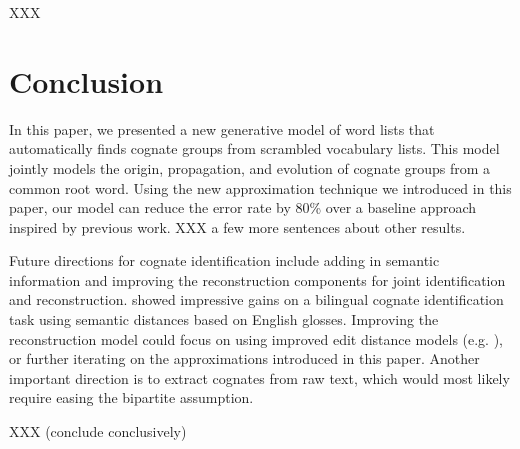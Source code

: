 \documentclass[11pt,a4paper]{article}
\begin{document}
XXX

\section{Conclusion}

In this paper, we presented a new generative model of word lists
that automatically finds cognate groups from scrambled vocabulary
lists. This model jointly models the origin, propagation, and
evolution of cognate groups from a common root word. Using the new
approximation technique we introduced in this paper, our model can
reduce the error rate by 80\% over a baseline approach inspired by
previous work. XXX a few more sentences about other results.

Future directions for cognate identification include adding in
semantic information and improving the reconstruction components
for joint identification and reconstruction. 
showed impressive gains on a bilingual cognate identification task
using semantic distances based on English glosses.  Improving the
reconstruction model could focus on using improved edit distance
models (e.g. ), or further iterating
on the approximations introduced in this paper.  Another important
direction is to extract cognates from raw text, which would most
likely require easing the bipartite assumption.

XXX (conclude conclusively)



\end{document}
